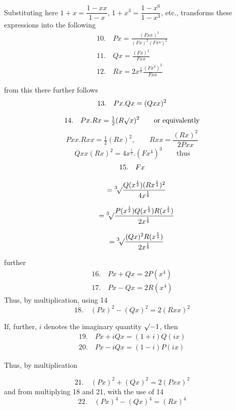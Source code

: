 Substituting here $1+x=\dfrac{1-xx}{1-x}$, $1+x^3=\dfrac{1-x^6}{1-x^3}$, etc., transforms these expressions into the following
\[
\begin{gathered}
10.\quad Px=\frac{(Fxx)^5}{(Fx)^2(Fx^4)^2}\\[8pt]
11.\quad Qx=\frac{(Fx)^2}{Fxx}\\[8pt]
12.\quad Rx=2x^{\frac14}\frac{(Fx^4)^2}{Fxx}
\end{gathered}
\]

from this there further follows
\[
\begin{gathered}
13.\quad Px.Qx=(Qxx)^2\\[8pt]
14.\quad Px.Rx=\tfrac12(R\mathord{\surd}{x})^2\qquad\text{or equivalently}
\end{gathered}
\]
\[
Pxx.Rxx=\tfrac12(Rx)^2,\qquad Rxx=\frac{(Rx)^2}{2Pxx}
\]
\[
Qxx(Rx)^2=4x^{\frac12}.(Fx^4)^3\qquad\text{thus}
\]
\[
\begin{gathered}15.\quad Fx\\[8pt]\quad{}=\mathord{{}^{3}\!\surd}{\frac{Q(x^{\frac12})(Rx^{\frac14})^2}{4x^{\frac18}}}
\\[8pt]\quad{}=\mathord{{}^{3}\!\surd}{\frac{P(x^{\frac12})Q(x^{\frac12})R(x^{\frac12})}{2x^{\frac18}}}
\\[8pt]\quad{}=\mathord{{}^{3}\!\surd}{\frac{(Qx)^2R(x^{\frac12})}{2x^{\frac18}}}\end{gathered}
\]

further
\[
\begin{gathered}
16.\quad Px+Qx=2P(x^4)\\[8pt]
17.\quad Px-Qx=2R(x^4)
\end{gathered}
\]
Thus, by multiplication, using 14
\[
18.\quad (Px)^2-(Qx)^2=2(Rxx)^2
\]

If, further, $i$ denotes the imaginary quantity $\mathord{\surd}{-1}$, then
\[
\begin{gathered}
19.\quad Px+iQx=(1+i)Q(ix)\\[8pt]
20.\quad Px-iQx=(1-i)P(ix)
\end{gathered}
\]

Thus, by multiplication


\[
21.\quad (Px)^2+(Qx)^2=2(Pxx)^2
\]
and from multiplying 18 and 21, with the use of 14
\[
22.\quad (Px)^4-(Qx)^4=(Rx)^4
\]

